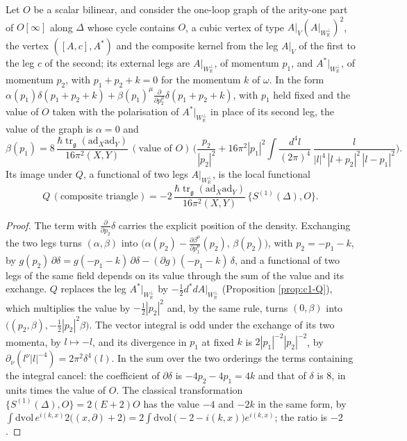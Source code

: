 \begin{proposition}
\label{prop:c9-triangle}
Let $O$ be a scalar bilinear, and consider the one-loop graph of the arity-one part of $O[\infty]$ along $\Delta$ whose cycle contains $O$, a cubic vertex of type $A|_V(A|_{W_{\mathbb R}^\perp})^2$, the vertex $([A,c],A^*)$ and the composite kernel from the leg $A|_V$ of the first to the leg $c$ of the second; its external legs are $A|_{W_{\mathbb R}^\perp}$, of momentum $p_1$, and $A^*|_{W_{\mathbb R}^\perp}$, of momentum $p_2$, with $p_1+p_2+k=0$ for the momentum $k$ of $\omega$. In the form $\alpha(p_1)\delta(p_1+p_2+k)+\beta(p_1)^\mu\frac{\partial}{\partial p_2^\mu}\delta(p_1+p_2+k)$, with $p_1$ held fixed and the value of $O$ taken with the polarisation of $A^*|_{W_{\mathbb R}^\perp}$ in place of its second leg, the value of the graph is $\alpha=0$ and
\[
\beta(p_1)=8\,\frac{\hbar\operatorname{tr}_{\mathfrak g}(\mathrm{ad}_X\mathrm{ad}_Y)}{16\pi^2(X,Y)}\,(\text{value of }O)\,\Big(\frac{p_2}{|p_2|^2}+16\pi^2|p_1|^2\int\frac{d^4l}{(2\pi)^4}\,\frac{l}{|l|^4\,|l+p_2|^2\,|l-p_1|^2}\Big).
\]
Its image under $Q$, a functional of two legs $A|_{W_{\mathbb R}^\perp}$, is the local functional
\begin{equation}
Q\,(\text{composite triangle})=-2\,\frac{\hbar\operatorname{tr}_{\mathfrak g}(\mathrm{ad}_X\mathrm{ad}_Y)}{16\pi^2(X,Y)}\,\{S^{(1)}(\Delta),O\}.
\label{eq:c9-triangle}
\end{equation}
\end{proposition}

\begin{proof}
The term with $\frac{\partial}{\partial p_2}\delta$ carries the explicit position of the density. Exchanging the two legs turns $(\alpha,\beta)$ into $\big(\alpha(p_2)-\tfrac{\partial\beta^\mu}{\partial p_1^\mu}(p_2),\,\beta(p_2)\big)$, with $p_2=-p_1-k$, by $g(p_2)\,\partial\delta=g(-p_1-k)\,\partial\delta-(\partial g)(-p_1-k)\,\delta$, and a functional of two legs of the same field depends on its value through the sum of the value and its exchange. $Q$ replaces the leg $A^*|_{W_{\mathbb R}^\perp}$ by $-\tfrac12d^*dA|_{W_{\mathbb R}^\perp}$ (Proposition \ref{prop:c1-Q}), which multiplies the value by $-\tfrac12|p_2|^2$ and, by the same rule, turns $(0,\beta)$ into $\big((p_2,\beta),-\tfrac12|p_2|^2\beta\big)$. The vector integral is odd under the exchange of its two momenta, by $l\mapsto-l$, and its divergence in $p_1$ at fixed $k$ is $2|p_1|^{-2}|p_2|^{-2}$, by $\partial_\nu(l^\nu|l|^{-4})=2\pi^2\delta^4(l)$. In the sum over the two orderings the terms containing the integral cancel: the coefficient of $\partial\delta$ is $-4p_2-4p_1=4k$ and that of $\delta$ is $8$, in units times the value of $O$. The classical transformation $\{S^{(1)}(\Delta),O\}=2(E+2)O$ has the value $-4$ and $-2k$ in the same form, by $\int\mathrm{dvol}\,e^{i(k,x)}2\big((x,\partial)+2\big)=2\int\mathrm{dvol}\,\big(-2-i(k,x)\big)e^{i(k,x)}$; the ratio is $-2$.
\end{proof}

